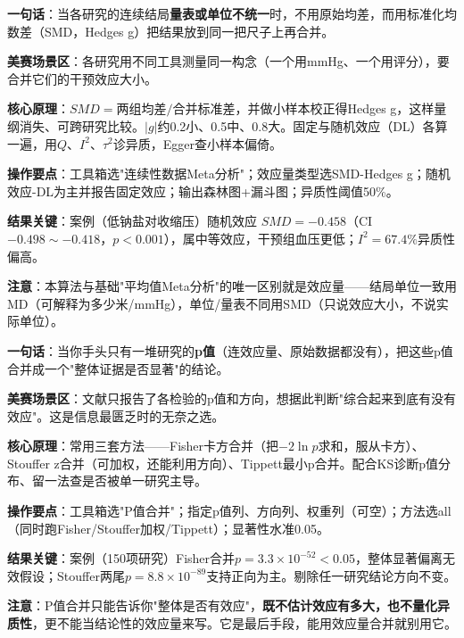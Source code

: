 
\begin{algobrief}
\textbf{一句话}：当各研究的连续结局\textbf{量表或单位不统一}时，不用原始均差，而用标准化均数差（SMD，Hedges g）把结果放到同一把尺子上再合并。

\textbf{美赛场景区}：各研究用不同工具测量同一构念（一个用mmHg、一个用评分），要合并它们的干预效应大小。

\textbf{核心原理}：$SMD = $两组均差$/$合并标准差，并做小样本校正得Hedges g，这样量纲消失、可跨研究比较。$|g|$约0.2小、0.5中、0.8大。固定与随机效应（DL）各算一遍，用$Q$、$I^2$、$\tau^2$诊异质，Egger查小样本偏倚。

\textbf{操作要点}：工具箱选"连续性数据Meta分析"；效应量类型选SMD-Hedges g；随机效应-DL为主并报告固定效应；输出森林图+漏斗图；异质性阈值50\%。

\textbf{结果关键}：案例（低钠盐对收缩压）随机效应 $SMD=-0.458$（CI $-0.498\sim-0.418$，$p<0.001$），属中等效应，干预组血压更低；$I^2=67.4\%$异质性偏高。

\textbf{注意}：本算法与基础"平均值Meta分析"的唯一区别就是效应量——结局单位一致用MD（可解释为多少米/mmHg），单位/量表不同用SMD（只说效应大小，不说实际单位）。
\end{algobrief}


\begin{algobrief}
\textbf{一句话}：当你手头只有一堆研究的\textbf{p值}（连效应量、原始数据都没有），把这些p值合并成一个"整体证据是否显著"的结论。

\textbf{美赛场景区}：文献只报告了各检验的p值和方向，想据此判断"综合起来到底有没有效应"。这是信息最匮乏时的无奈之选。

\textbf{核心原理}：常用三套方法——Fisher卡方合并（把$-2\ln p$求和，服从卡方）、Stouffer z合并（可加权，还能利用方向）、Tippett最小p合并。配合KS诊断p值分布、留一法查是否被单一研究主导。

\textbf{操作要点}：工具箱选"P值合并"；指定p值列、方向列、权重列（可空）；方法选all（同时跑Fisher/Stouffer加权/Tippett）；显著性水准0.05。

\textbf{结果关键}：案例（150项研究）Fisher合并$p=3.3\times10^{-52}<0.05$，整体显著偏离无效假设；Stouffer两尾$p=8.8\times10^{-89}$支持正向为主。剔除任一研究结论方向不变。

\textbf{注意}：P值合并只能告诉你"整体是否有效应"，\textbf{既不估计效应有多大，也不量化异质性}，更不能当结论性的效应量来写。它是最后手段，能用效应量合并就别用它。
\end{algobrief}

